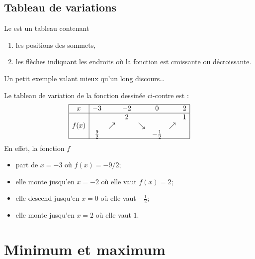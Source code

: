 \subsection{Tableau de variations}

Le  est un tableau contenant
\begin{enumerate}
    \item
        les positions des sommets,
    \item
        les flèches indiquant les endroits où la fonction est croissante ou décroissante.
\end{enumerate}
Un petit exemple valant mieux qu'un long discours\ldots

\begin{wrapfigure}{r}{6.0cm}
   \vspace{-1cm}        %
   \centering
   
\end{wrapfigure}

    Le tableau de variation de la fonction dessinée ci-contre est :
    \begin{equation}
    \begin{array}[h]{|c|ccccccc|}
        \hline
        x&-3&&-2&&0&&2\\
        \hline
        &&&2&&&&1\\
        f(x)&&\nearrow&&\searrow&&\nearrow&\\
        &\frac{ 9 }{2}&&&&-\frac{ 1 }{2}&&\\
        \hline
    \end{array}
    \end{equation}
    En effet, la fonction \( f\)
    \begin{itemize}
        \item 
            part de \( x=-3\) où \( f(x)=-9/2\);
        \item
            elle monte jusqu'en \( x=-2\) où elle vaut \( f(x)=2\);
        \item
            elle descend jusqu'en \( x=0\) où elle vaut \( -\frac{ 1 }{2}\);
        \item
            elle monte jusqu'en \( x=2\) où elle vaut \( 1\).
    \end{itemize}


\section{Minimum et maximum}

